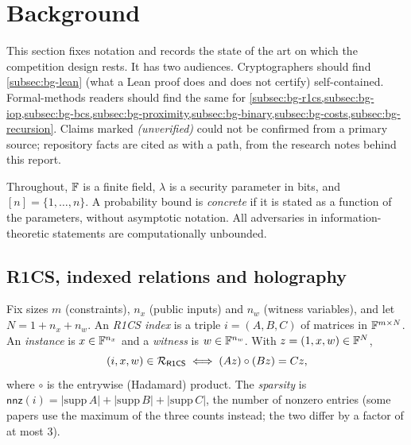 \section{Background}\label{sec:background}

This section fixes notation and records the state of the art on which the competition design
rests. It has two audiences. Cryptographers should find
\cref{subsec:bg-lean} (what a Lean proof does and does not certify) self-contained. Formal-methods
readers should find the same for \cref{subsec:bg-r1cs,subsec:bg-iop,subsec:bg-bcs,subsec:bg-proximity,subsec:bg-binary,subsec:bg-costs,subsec:bg-recursion}.
Claims marked \emph{(unverified)} could not be confirmed from a primary source; repository facts
are cited as  with a path, from the research notes behind this report.

Throughout, $\mathbb{F}$ is a finite field, $\lambda$ is a security parameter in bits, and
$[n]=\{1,\dots,n\}$. A probability bound is \emph{concrete} if it is stated as a function of the
parameters, without asymptotic notation. All adversaries in information-theoretic statements are
computationally unbounded.

\subsection{R1CS, indexed relations and holography}\label{subsec:bg-r1cs}

\begin{definition}[R1CS]\label{def:bg-r1cs}
Fix sizes $m$ (constraints), $n_x$ (public inputs) and $n_w$ (witness variables), and let
$N = 1+n_x+n_w$. An \emph{R1CS index} is a triple $i=(A,B,C)$ of matrices in $\mathbb{F}^{m\times N}$.
An \emph{instance} is $x\in\mathbb{F}^{n_x}$ and a \emph{witness} is $w\in\mathbb{F}^{n_w}$. With
$z=(1,x,w)\in\mathbb{F}^N$,
\[
  (i,x,w)\in\mathcal{R}_{\mathsf{R1CS}} \iff (A z)\circ(B z) = C z ,
\]
where $\circ$ is the entrywise (Hadamard) product. The \emph{sparsity} is
$\mathsf{nnz}(i) = |\mathrm{supp}\,A|+|\mathrm{supp}\,B|+|\mathrm{supp}\,C|$, the number of nonzero
entries (some papers use the maximum of the three counts instead; the two differ by a factor of at
most $3$).
\end{definition}

